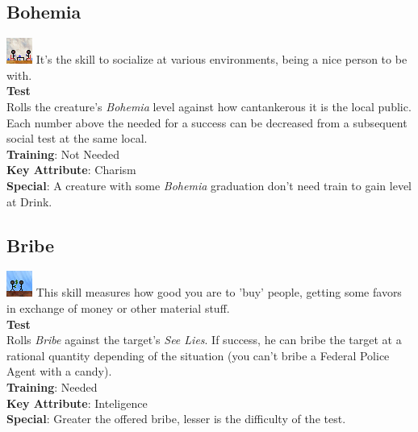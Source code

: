 \documentclass[ letterpaper,12pt]{article}
\begin{document}
\subsection{Bohemia}
\includegraphics{../data/skills/Img/boemia.png}
It's the skill to socialize at various environments, being a nice person to be with.\\
{\bf Test}\\
Rolls the creature's {\it Bohemia} level against how cantankerous it is the local public. Each number above the needed for a success can be decreased from a subsequent social test at the same local.\\
{\bf Training}: Not Needed\\
{\bf Key Attribute}: Charism\\
{\bf Special}: A creature with some {\it Bohemia} graduation don't need train to gain level at Drink.

\subsection{Bribe}
\includegraphics{../data/skills/Img/suborno.png}
This skill measures how good you are to 'buy' people, getting some favors in exchange of money or other material stuff.\\
{\bf Test}\\
Rolls {\it Bribe} against the target's {\it See Lies}. If success, he can bribe the target at a rational quantity depending of the situation (you can't bribe a Federal Police Agent with a candy).\\
{\bf Training}: Needed\\
{\bf Key Attribute}: Inteligence\\
{\bf Special}: Greater the offered bribe, lesser is the difficulty of the test.
\end{document}

